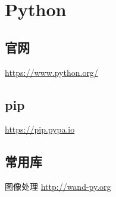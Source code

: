 
\chapter{Python}
\section{官网}
\url{https://www.python.org/}

\section{pip}
\url{https://pip.pypa.io}

\section{常用库}
图像处理
\url{http://wand-py.org}